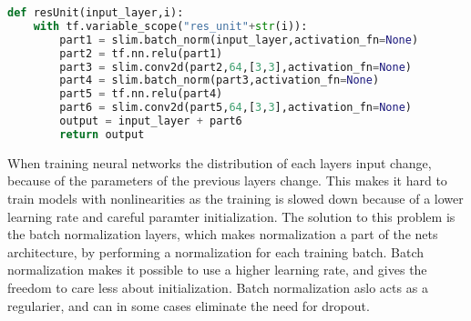 \begin{lstlisting}[language=Python, label=lst:resblock, caption=Function resUnit that creates the residual block]
def resUnit(input_layer,i):
    with tf.variable_scope("res_unit"+str(i)):
        part1 = slim.batch_norm(input_layer,activation_fn=None)
        part2 = tf.nn.relu(part1)
        part3 = slim.conv2d(part2,64,[3,3],activation_fn=None)
        part4 = slim.batch_norm(part3,activation_fn=None)
        part5 = tf.nn.relu(part4)
        part6 = slim.conv2d(part5,64,[3,3],activation_fn=None)
        output = input_layer + part6
        return output
\end{lstlisting}

When training neural networks the distribution of each layers input change, because of the parameters of the previous layers change\citep{BATCH}. This makes it hard to train models with nonlinearities as the training is slowed down because of a lower learning rate and careful paramter initialization. The solution to this problem is the batch normalization layers, which makes normalization a part of the nets architecture, by performing a normalization for each training batch. Batch normalization makes it possible to use a higher learning rate, and gives the freedom to care less about initialization. Batch normalization aslo acts as a regularier, and can in some cases eliminate the need for dropout.

